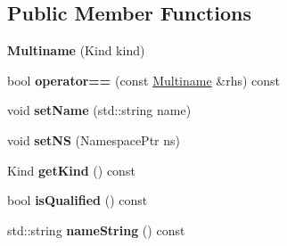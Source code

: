 \subsection*{Public Member Functions}
\begin{DoxyCompactItemize}
\item 
\hypertarget{structjswf_1_1avm2_1_1_multiname_adaff16969a61aee2a61d94e190be2abb}{{\bfseries Multiname} (Kind kind)}\label{structjswf_1_1avm2_1_1_multiname_adaff16969a61aee2a61d94e190be2abb}

\item 
\hypertarget{structjswf_1_1avm2_1_1_multiname_a1c0b18cf3273f9c17974b3be94651f7d}{bool {\bfseries operator==} (const \hyperlink{structjswf_1_1avm2_1_1_multiname}{Multiname} \&rhs) const }\label{structjswf_1_1avm2_1_1_multiname_a1c0b18cf3273f9c17974b3be94651f7d}

\item 
\hypertarget{structjswf_1_1avm2_1_1_multiname_ad78ee0038f3ed1b83378b668c75e8e06}{void {\bfseries set\+Name} (std\+::string name)}\label{structjswf_1_1avm2_1_1_multiname_ad78ee0038f3ed1b83378b668c75e8e06}

\item 
\hypertarget{structjswf_1_1avm2_1_1_multiname_a8380725739ffd1ad4f00efac3f875de9}{void {\bfseries set\+N\+S} (Namespace\+Ptr ns)}\label{structjswf_1_1avm2_1_1_multiname_a8380725739ffd1ad4f00efac3f875de9}

\item 
\hypertarget{structjswf_1_1avm2_1_1_multiname_ae07c51d441478d22c20b9a53c429568e}{Kind {\bfseries get\+Kind} () const }\label{structjswf_1_1avm2_1_1_multiname_ae07c51d441478d22c20b9a53c429568e}

\item 
\hypertarget{structjswf_1_1avm2_1_1_multiname_aba782cb5a75fad2f3e0606e54480c3d3}{bool {\bfseries is\+Qualified} () const }\label{structjswf_1_1avm2_1_1_multiname_aba782cb5a75fad2f3e0606e54480c3d3}

\item 
\hypertarget{structjswf_1_1avm2_1_1_multiname_ac509d13e2fad07812d8e293888c85349}{std\+::string {\bfseries name\+String} () const }\label{structjswf_1_1avm2_1_1_multiname_ac509d13e2fad07812d8e293888c85349}

\end{DoxyCompactItemize}
